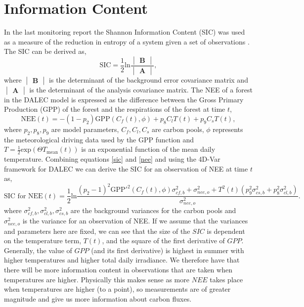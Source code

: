 \documentclass[11pt]{article}
\begin{document}
\section{Information Content}

In the last monitoring report the Shannon Information Content (SIC) was used as a measure of the reduction in entropy of a system given a set of observations \cite{stewart2008correlated}. The SIC can be derived as,
\begin{equation} \label{sic}
\text{SIC}=\frac{1}{2}\text{ln}\frac{\begin{vmatrix} \textbf{B} \end{vmatrix}}{\begin{vmatrix} \textbf{A} \end{vmatrix}},
\end{equation}
where $\begin{vmatrix} \textbf{B} \end{vmatrix}$ is the determinant of the background error covariance matrix and $\begin{vmatrix} \textbf{A} \end{vmatrix}$ is the determinant of the analysis covariance matrix. The NEE of a forest in the DALEC model is expressed as the difference between the Gross Primary Production (GPP) of the forest and the respirations of the forest at time $t$,
\begin{equation} \label{nee}
\text{NEE}(t)=-(1-p_2)\text{GPP}(C_f(t),\phi)+p_8C_lT(t)+p_9C_sT(t),
\end{equation}
where $p_2, p_8, p_9$ are model parameters, $C_f, C_l, C_s$ are carbon pools, $\phi$ represents the meteorological driving data used by the GPP function and $T=\frac{1}{2}\text{exp}(\Theta T_{\text{mean}}(t))$ is an exponential function of the mean daily temperature. Combining equations \ref{sic} and \ref{nee} and using the 4D-Var framework for DALEC we can derive the SIC for an observation of NEE at time $t$ as,
\begin{equation}
\text{SIC for NEE}(t)=\frac{1}{2}\text{ln}\frac{(p_{2}-1)^{2}\text{GPP}'^{2}(C_f(t), \phi)\sigma_{cf,b}^{2}+\sigma_{nee,o}^{2}+T^2(t)(p_{9}^2\sigma_{cs,b}^2+p_8^2\sigma_{cl,b}^2)}{\sigma_{nee,o}^{2}}.
\end{equation}
where $\sigma_{cf,b}^{2}, \sigma_{cl,b}^2, \sigma_{cs,b}^2$ are the background variances for the carbon pools and $\sigma_{nee,o}^{2}$ is the variance for an observation of NEE. If we assume that the variances and parameters here are fixed, we can see that the size of the $SIC$ is dependent on the temperature term, $T(t)$, and the square of the first derivative of $GPP$. Generally, the value of $GPP$ (and its first derivative) is highest in summer with higher temperatures and higher total daily irradiance. We therefore have that there will be more information content in observations that are taken when temperatures are higher. Physically this makes sense as more $NEE$ takes place when temperatures are higher (to a point), so measurements are of greater magnitude and give us more information about carbon fluxes. 
\end{document}
